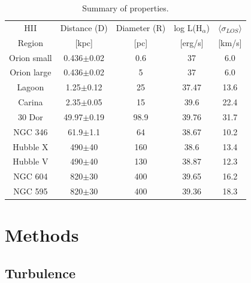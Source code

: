 \documentclass[fleqn,usenatbib, useAMS, a4paper]{mnras}
\begin{document}
\begin{table}
\begin{center}\caption{Summary of properties.}
\begin{tabular}{ccccc}\hline
HII       &  Distance (D)          & Diameter (R) & log L(H$_{\alpha}$) &  \(\langle \sigma_{LOS} \rangle \) \\
Region    &  [kpc]          &  [pc]    &  [erg/s]            &    [km/s]  \\ 
\hline
Orion small   & 0.436$\pm$0.02  & 0.6  &    37               &   6.0      \\
Orion large   & 0.436$\pm$0.02  & 5    &    37               &   6.0      \\ 
Lagoon    & 1.25$\pm$0.12   & 25       &    37.47            &   13.6     \\
Carina    & 2.35$\pm$0.05   & 15       &    39.6             &   22.4     \\
30 Dor    & 49.97$\pm$0.19  & 98.9     &    39.76            &   31.7     \\
NGC 346   & 61.9$\pm$1.1    & 64       &    38.67            &   10.2     \\
Hubble X  & 490$\pm$40      & 160      &    38.6             &   13.4     \\
Hubble V  & 490$\pm$40      & 130      &    38.87            &   12.3     \\
NGC 604   & 820$\pm$30      & 400      &    39.65            &   16.2     \\
NGC 595   & 820$\pm$30      & 400      &    39.36            &   18.3     \\
\hline
\end{tabular}\label{tab:Reg}
\end{center}
\end{table} 



\section{Methods}\label{sec:met}

\subsection{Turbulence}
\end{document}
